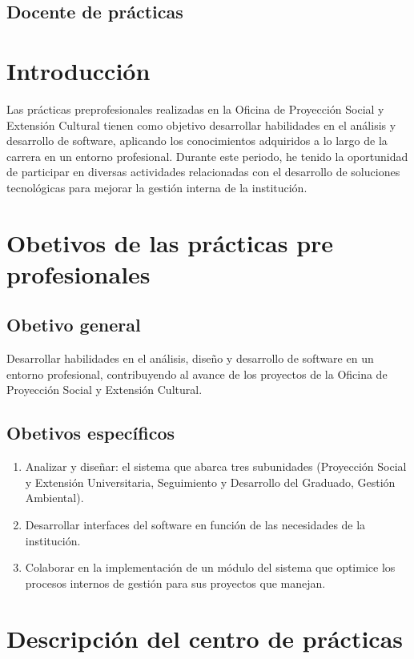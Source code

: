 \subsection{Docente de prácticas}
\DocenteNombre

\newpage
\section{Introducción}
Las prácticas preprofesionales realizadas en la Oficina de Proyección Social y Extensión Cultural tienen como objetivo desarrollar habilidades en el análisis y desarrollo de software, aplicando los conocimientos adquiridos a lo largo de la carrera en un entorno profesional. Durante este periodo, he tenido la oportunidad de participar en diversas
actividades relacionadas con el desarrollo de soluciones tecnológicas para mejorar la gestión interna de la institución. 

\section{Obetivos de las prácticas pre profesionales}
\subsection{Obetivo general}
Desarrollar habilidades en el análisis, diseño y desarrollo de software en un entorno profesional, contribuyendo al avance de los proyectos de la Oficina de Proyección Social y Extensión Cultural.

\subsection{Obetivos específicos}
\begin{enumerate}
    \item Analizar y diseñar: el sistema que abarca tres subunidades (Proyección Social y Extensión Universitaria, Seguimiento y Desarrollo del Graduado, Gestión Ambiental).
    \item Desarrollar interfaces del software en función de las necesidades de la institución.
    \item Colaborar en la implementación de un módulo del sistema que optimice los procesos internos de gestión para sus proyectos que manejan.
    
\end{enumerate}

\section{Descripción del centro de prácticas}
